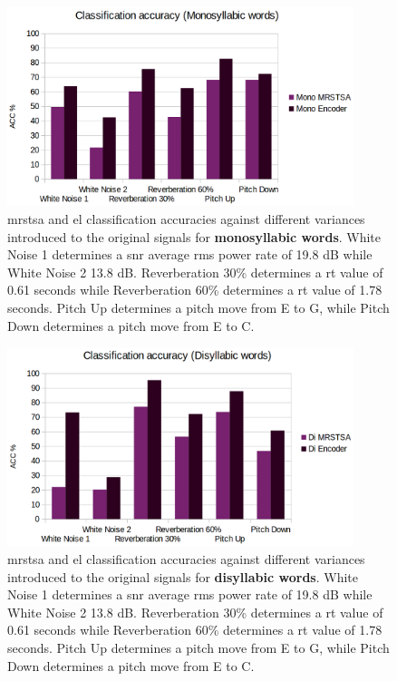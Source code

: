 \documentclass[10pt,letterpaper]{article}
\begin{document}
\begin{figure}[h!]
    \centering
    \includegraphics[width=0.9\textwidth]{MONO_ACC.png}
    \caption{\gls{mrstsa} and \gls{el} classification accuracies against different variances introduced to the original signals
    for \textbf{monosyllabic words}.
    White Noise 1 determines a \gls{snr} average \gls{rms} power rate of 19.8 dB while White Noise 2 13.8 dB.
    Reverberation 30\% determines a \gls{rt} value of 0.61 seconds while Reverberation 60\% determines a \gls{rt} value of 1.78 seconds.
    Pitch Up determines a pitch move from E to G, while Pitch Down determines a pitch move from E to C.}
    \label{fig:MONO_ACC}
\end{figure}

\begin{figure}[h!]
    \centering
    \includegraphics[width=0.9\textwidth]{DI_ACC.png}
    \caption{\gls{mrstsa} and \gls{el} classification accuracies against different variances introduced to the original signals
    for \textbf{disyllabic words}.
    White Noise 1 determines a \gls{snr} average \gls{rms} power rate of 19.8 dB while White Noise 2 13.8 dB.
    Reverberation 30\% determines a \gls{rt} value of 0.61 seconds while Reverberation 60\% determines a \gls{rt} value of 1.78 seconds.
    Pitch Up determines a pitch move from E to G, while Pitch Down determines a pitch move from E to C.}
    \label{fig:DI_ACC}
\end{figure}
\end{document}
